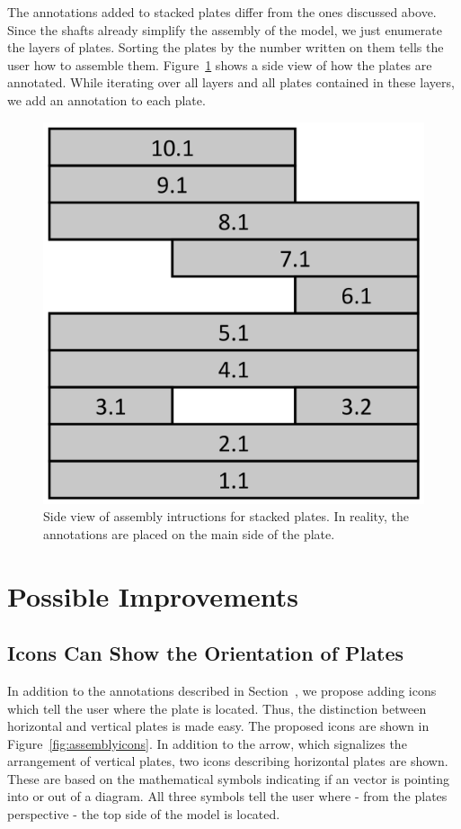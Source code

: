 \documentclass[../ClassicThesis.tex]{subfiles}
\begin{document}
The annotations added to stacked plates differ from the ones discussed above. Since the shafts already simplify the assembly of the model, we just enumerate the layers of plates. Sorting the plates by the number written on them tells the user how to assemble them. Figure~\ref{fig:assemblystacked} shows a side view of how the plates are annotated. While iterating over all layers and all plates contained in these layers, we add an annotation to each plate.

\begin{figure}
    \centering
    \includegraphics[width=0.4\columnwidth]{Images/assembly_stacked.png}
    \caption{Side view of assembly intructions for stacked plates. In reality, the annotations are placed on the main side of the plate.}
    \label{fig:assemblystacked}
\end{figure}

\section{Possible Improvements}\label{sec:assemblyimprovements}
\subsection{Icons Can Show the Orientation of Plates}

In addition to the annotations described in Section~, we propose adding icons which tell the user where the plate is located. Thus, the distinction between horizontal and vertical plates is made easy. The proposed icons are shown in Figure~\ref{fig:assemblyicons}. In addition to the arrow, which signalizes the arrangement of vertical plates, two icons describing horizontal plates are shown. These are based on the mathematical symbols indicating if an vector is pointing into or out of a diagram. All three symbols tell the user where - from the plates perspective - the top side of the model is located.
\end{document}
